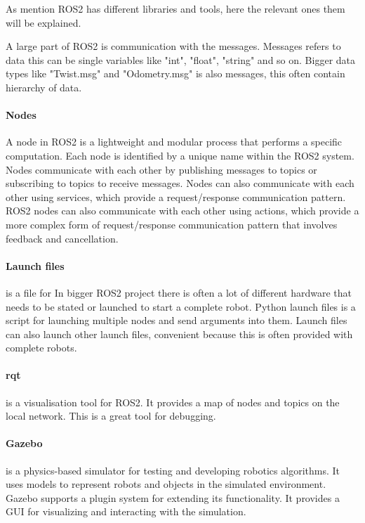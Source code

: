 As mention ROS2 has different libraries and tools, here the relevant ones them will be explained. 

A large part of ROS2 is communication with the messages. Messages refers to data this can be single variables like "int", "float", "string" and so on. Bigger data types like "Twist.msg" and "Odometry.msg" is also messages, this often contain hierarchy of data. 

\paragraph{Nodes}
A node in ROS2 is a lightweight and modular process that performs a specific computation. Each node is identified by a unique name within the ROS2 system. Nodes communicate with each other by publishing messages to topics or subscribing to topics to receive messages. Nodes can also communicate with each other using services, which provide a request/response communication pattern. ROS2 nodes can also communicate with each other using actions, which provide a more complex form of request/response communication pattern that involves feedback and cancellation. 

\paragraph{Launch files} is a file for 
In bigger ROS2 project there is often a lot of different hardware that needs to be stated or launched to start a complete robot. Python launch files is a script for launching multiple nodes and send arguments into them. Launch files can also launch other launch files, convenient because this is often provided with complete robots. 

\paragraph{rqt} is a visualisation tool for ROS2. It provides a map of nodes and topics on the local network. This is a great tool for debugging. 

\paragraph{Gazebo} is a physics-based simulator for testing and developing robotics algorithms. It uses models to represent robots and objects in the simulated environment. Gazebo supports a plugin system for extending its functionality. It provides a GUI for visualizing and interacting with the simulation.  

